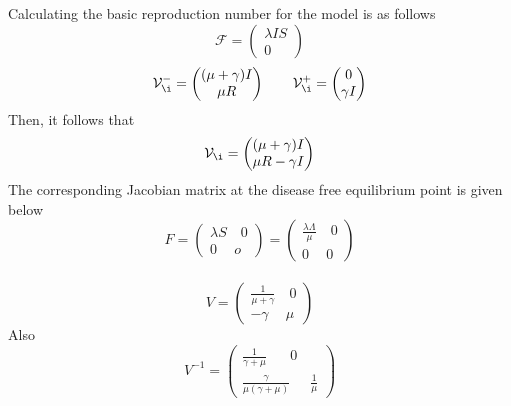\documentclass[a4paper,12pt]{report}
\numberwithin{equation}{section}
\begin{document}
Calculating the basic reproduction number for the model is as follows \\
\begin{equation*}
\mathcal{F} = \left( \begin{matrix}
\lambda IS \\
0
\end{matrix} \right)
\end{equation*}
\begin{equation*}
\mathcal{V_{\i}^{-
}} = \left( 
\begin{matrix}
(\mu + \gamma )I \\
\mu R 
\end{matrix}  \right) 
\qquad 
\mathcal{V_{\i}^{+}} = \left( 
\begin{matrix}
0 \\
\gamma I
\end{matrix} \right)
\end{equation*}
Then, it follows that 
\begin{equation*}
\mathcal{V_{\i}} = \left(
\begin{matrix}
(\mu + \gamma )I \\
\mu R - \gamma I
\end{matrix} \right)
\end{equation*}
The corresponding Jacobian matrix at the disease free equilibrium point is given below 
\begin{equation*}
F = \left( 
\begin{matrix}
\lambda S \quad 0 \\
0  \ \quad o
\end{matrix} \right) = 
\left( 
\begin{matrix}
\frac{\lambda \Lambda }{\mu } \quad 0 \\
0 \ \quad 0
\end{matrix} \right)
\end{equation*}\\
\begin{equation*}
V = \left( 
\begin{matrix}
\frac{1}{\mu + \gamma} \quad 0 \\
- \gamma \ \quad \mu
\end{matrix} \right)
\end{equation*}
Also  \\
\begin{equation*}
V^{-1} = 
\left( 
\begin{matrix}
\frac{1}{\gamma + \mu } \ \ \ \quad 0 \\
\frac{\gamma}{\mu (\gamma + \mu )} \ \ \quad \frac{1}{\mu}
\end{matrix}\right)
\end{equation*}\\
\end{document}
